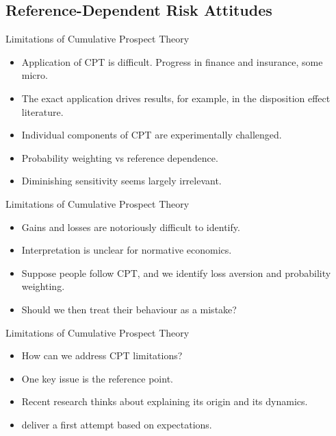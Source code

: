 \subsection{Reference-Dependent Risk Attitudes}


\begin{frame}{Limitations of Cumulative Prospect Theory}
 \begin{itemize}
 \item Application of CPT is difficult. Progress in finance and insurance, some micro.\medskip
 \item The exact application drives results, for example, in the disposition effect literature.\medskip
 \item Individual components of CPT are experimentally challenged.\medskip
 \item Probability weighting vs reference dependence.\medskip
 \item Diminishing sensitivity seems largely irrelevant.\medskip
 \end{itemize}
\end{frame}

\begin{frame}{Limitations of Cumulative Prospect Theory}
 \begin{itemize}
 \item Gains and losses are notoriously difficult to identify.\medskip
 \item Interpretation is unclear for normative economics.\medskip
 \item Suppose people follow CPT, and we identify loss aversion and probability weighting.\medskip
 \item Should we then treat their behaviour as a mistake?\medskip
 \end{itemize}
\end{frame}



\begin{frame}{Limitations of Cumulative Prospect Theory}
 \begin{itemize}
 \item How can we address CPT limitations?\medskip
 \item One key issue is the reference point.\medskip
 \item Recent research thinks about explaining its origin and its dynamics.\medskip
     \item \citet{KoeszegiRabin2006, KoeszegiRabin2007} deliver a first attempt based on expectations.\medskip
 \end{itemize}
\end{frame}


